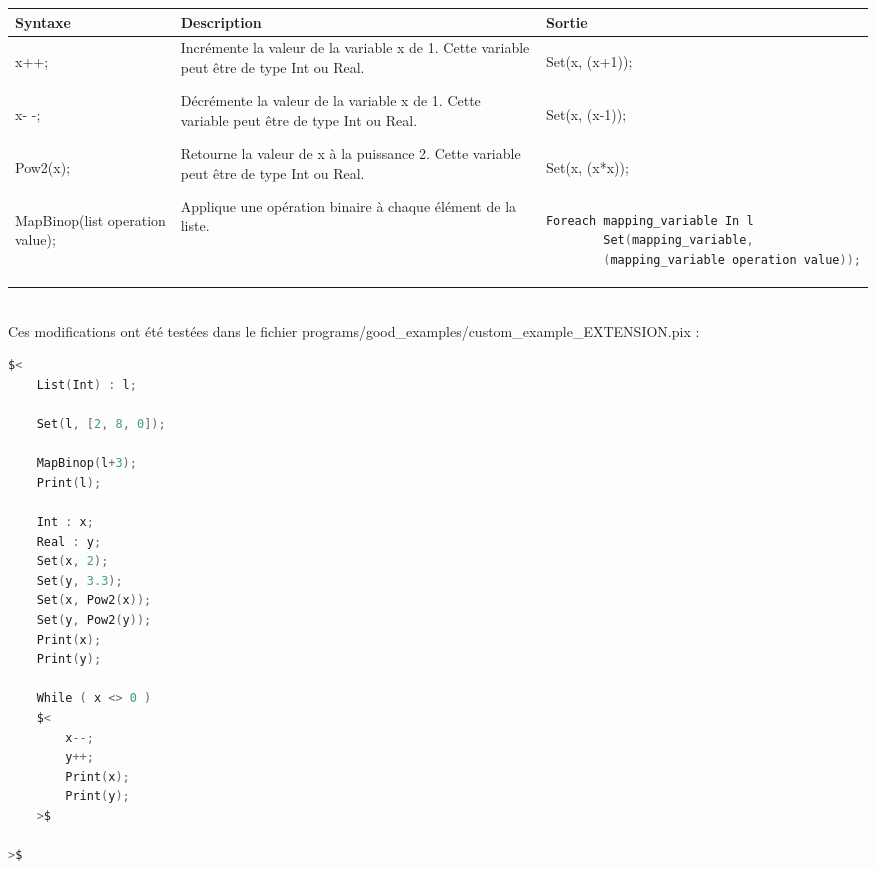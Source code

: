 \documentclass{report}
\begin{document}
    \begin{tabular}{| m{3cm} | m{7cm} | m{5cm} |}
        \hline
        Syntaxe & Description & Sortie \\
        \hline
        \begin{center}
x++;
        \end{center}
        & Incrémente la valeur de la variable x de 1. Cette variable peut être de type Int ou Real. & 
        \begin{center}
Set(x, (x+1));
        \end{center}\\
        \hline
        \begin{center}
x- -;
        \end{center}
        & Décrémente la valeur de la variable x de 1. Cette variable peut être de type Int ou Real. & 
        \begin{center}
Set(x, (x-1));
        \end{center}\\
        \hline
        \begin{center}
Pow2(x);
        \end{center}
        & Retourne la valeur de x à la puissance 2. Cette variable peut être de type Int ou Real. & 
        \begin{center}
Set(x, (x*x));
        \end{center}\\
        \hline
        {\tiny
        \begin{center}
MapBinop(list operation value);
        \end{center}
        }
        & Applique une opération binaire à chaque élément de la liste. & 
        {\tiny
        \begin{lstlisting}[language=C, basicstyle=\ttfamily]
Foreach mapping_variable In l
        Set(mapping_variable, 
        (mapping_variable operation value));
        \end{lstlisting}
        }\\
        \hline
    \end{tabular}\\

Ces modifications ont été testées dans le fichier programs/good\_examples/custom\_example\_EXTENSION.pix :\\

    \begin{lstlisting}[language=C, basicstyle=\ttfamily]
$<
    List(Int) : l;

    Set(l, [2, 8, 0]);
    
    MapBinop(l+3);
    Print(l);

    Int : x;
    Real : y;
    Set(x, 2);
    Set(y, 3.3);
    Set(x, Pow2(x));
    Set(y, Pow2(y));
    Print(x);
    Print(y);

    While ( x <> 0 )
    $<
        x--;
        y++;
        Print(x);
        Print(y);
    >$
    
>$
    \end{lstlisting}
\end{document}
